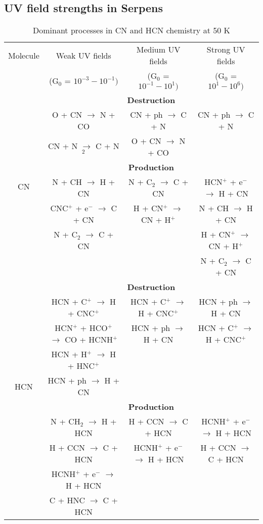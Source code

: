 \documentclass{aa}
\begin{document}
\subsection{UV field strengths in Serpens}
\begin{table*} 
\caption{Dominant processes in CN and HCN chemistry at 50 K}      
\centering       %
\label{reactions}    

\begin{tabular}{c c c c} 
\hline\hline 
Molecule & Weak UV fields  & Medium UV fields  & Strong UV fields  \\ 
& (G$_0$ = $10^{-3} - 10^{-1})$ & (G$_0$ = $10^{-1} - 10^{1})$ & (G$_0$ = $10^{1} - 10^{6})$ \\ 
\hline 
\multirow{8}{*}{CN} & \multicolumn{3}{c}{\textbf{Destruction}}\\ 
& O + CN $\rightarrow$ N + CO & CN + ph $\rightarrow$ C + N & CN + ph $\rightarrow$ C + N\\ 
& CN + N $\rightarrow$ C + N$_2$ & O + CN $\rightarrow$ N + CO & \\
\vspace{2.5 pt} &\multicolumn{3}{c}{\textbf{Production}}\\ 
&N + CH $\rightarrow$ H + CN & N + C$_2$ $\rightarrow$ C + CN &  HCN$^+$ + e$^-$ $\rightarrow$ H + CN\\
&CNC$^+$ + e$^-$ $\rightarrow$ C + CN & H + CN$^+$ $\rightarrow$ CN + H$^+$ & N + CH $\rightarrow$ H + CN\\
&N + C$_2$ $\rightarrow$ C + CN &  & H + CN$^+$ $\rightarrow$ CN + H$^+$\\ &  &   & N + C$_2$ $\rightarrow$ C + CN\\
\hline
\multirow{9}{*}{HCN} & \multicolumn{3}{c}{\textbf{Destruction}}\\ 
&HCN + C$^+$ $\rightarrow$ H + CNC$^+$ & HCN + C$^+$ $\rightarrow$ H + CNC$^+$ &  HCN + ph $\rightarrow$ H + CN\\
&HCN$^+$ + HCO$^+$ $\rightarrow$ CO + HCNH$^+$ &HCN + ph $\rightarrow$ H + CN & HCN + C$^+$ $\rightarrow$ H + CNC$^+$\\
&HCN + H$^+$ $\rightarrow$ H + HNC$^+$ &  &  \\
&HCN + ph $\rightarrow$ H + CN &  &  \\
\vspace{2.5 pt} 
&\multicolumn{3}{c}{\textbf{Production}}\\ 
&N + CH$_2$ $\rightarrow$ H + HCN & H + CCN $\rightarrow$ C + HCN & HCNH$^+$ + e$^-$ $\rightarrow$ H + HCN\\
&H + CCN $\rightarrow$ C + HCN & HCNH$^+$ + e$^-$ $\rightarrow$ H + HCN & H + CCN $\rightarrow$ C + HCN\\
&HCNH$^+$ + e$^-$ $\rightarrow$ H + HCN & & \\ 
&C + HNC $\rightarrow$ C + HCN & & \\ 
\hline \end{tabular} 
\end{table*}
\end{document}
